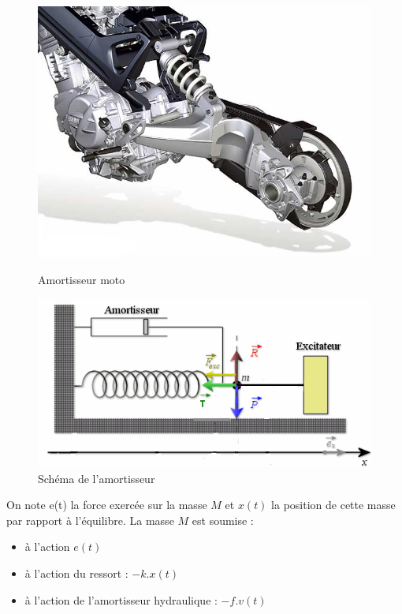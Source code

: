 \begin{figure}[htbp]
\begin{minipage}[c]{.48\linewidth}
\begin{center}
\includegraphics[width=0.8\linewidth]{img/moto.jpg}
\caption{Amortisseur moto}
\label{fig:image6}
\end{center}
\end{minipage}
\hfill
\begin{minipage}[c]{.50\linewidth}
\begin{center}
\includegraphics[width=0.8\linewidth]{img/amortisseur1.png}
\caption{Schéma de l'amortisseur}
\label{fig:image7}
\end{center}
\end{minipage}
\end{figure}

 
On note e(t) la force exercée sur la masse $M$ et $x(t)$ la position de cette masse par rapport à l'équilibre. La masse $M$ est soumise :  
\begin{itemize}
 \item à l'action $e(t)$
 \item à l'action du ressort : $-k.x(t)$
 \item à l'action de l'amortisseur hydraulique : $-f.v(t)$
\end{itemize}

